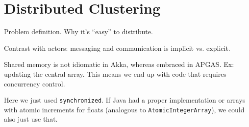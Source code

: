 \section{Distributed \kmeans Clustering}
\label{sec:kmeans}

Problem definition. Why it's ``easy'' to distribute.

Contrast with actors: messaging and communication is implicit vs. explicit.

Shared memory is not idiomatic in Akka, whereas embraced in APGAS. Ex: updating
the central array. This means we end up with code that requires concurrency
control.

Here we just used \lstinline{synchronized}. If Java had a proper
implementation or arrays with atomic increments for floats (analogous to
\lstinline{AtomicIntegerArray}), we could also just use that.
